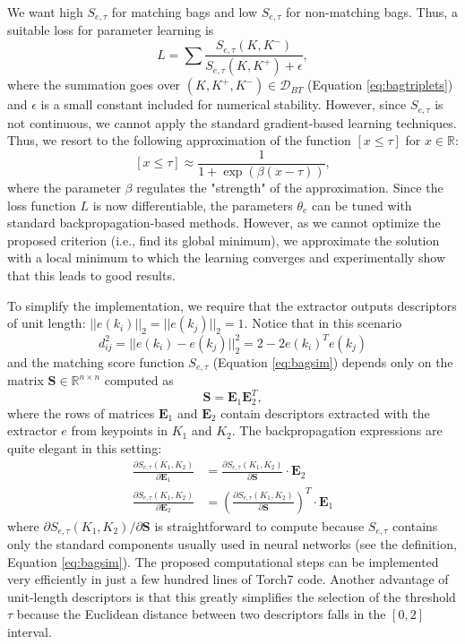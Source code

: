 \documentclass[10pt,conference,a4paper]{IEEEtran}
\begin{document}
		We want high $S_{e, \tau}$ for matching bags and low $S_{e, \tau}$ for non-matching bags.
		Thus, a suitable loss for parameter learning is
		\begin{equation}\label{eq:loss}
			L=
			\sum\frac{S_{e, \tau}(K, K^-)}{S_{e, \tau}(K, K^+) + \epsilon}
			,
		\end{equation}
		where the summation goes over $(K, K^+, K^-)\in\mathcal{D}_{BT}$ (Equation \eqref{eq:bagtriplets}) and $\epsilon$ is a small constant included for numerical stability.
		However, since $S_{e, \tau}$ is not continuous, we cannot apply the standard gradient-based learning techniques.
		Thus, we resort to the following approximation of the function $[x\leq\tau]$ for $x\in\mathbb{R}$:
		$$
			[x\leq\tau]\approx
			\frac{1}{1 + \exp(\beta(x-\tau))}
			,
		$$
		where the parameter $\beta$ regulates the "strength" of the approximation.
		Since the loss function $L$ is now differentiable, the parameters $\theta_e$ can be tuned with standard backpropagation-based methods.
		However, as we cannot optimize the proposed criterion (i.e., find its global minimum), we approximate the solution with a local minimum to which the learning converges and experimentally show that this leads to good results.

		To simplify the implementation, we require that the extractor outputs descriptors of unit length: $||e(k_i)||_2=||e(k_j)||_2=1$.
		Notice that in this scenario
		$$
			d_{ij}^2=
			|| e(k_i) - e(k_j) ||_2^2 =
			2 - 2e(k_i)^Te(k_j)
		$$
		and the matching score function $S_{e, \tau}$ (Equation \eqref{eq:bagsim}) depends only on the matrix $\mathbf{S}\in\mathbb{R}^{n\times n}$ computed as
		$$
			\mathbf{S}=
			\mathbf{E}_1\mathbf{E}_2^T
			,
		$$
		where the rows of matrices $\mathbf{E}_1$ and $\mathbf{E}_2$ contain descriptors extracted with the extractor $e$ from keypoints in $K_1$ and $K_2$.
		The backpropagation expressions are quite elegant in this setting:
		\begin{align*}
			\frac{\partial S_{e, \tau}(K_1, K_2)}{\partial \mathbf{E}_1}&=\frac{\partial S_{e, \tau}(K_1, K_2)}{\partial \mathbf{S}}\cdot\mathbf{E}_2	\\
			\frac{\partial S_{e, \tau}(K_1, K_2)}{\partial \mathbf{E}_2}&=\left(\frac{\partial S_{e, \tau}(K_1, K_2)}{\partial \mathbf{S}}\right)^T\cdot\mathbf{E}_1
		\end{align*}
		where $\partial S_{e, \tau}(K_1, K_2)/\partial \mathbf{S}$ is straightforward to compute because $S_{e, \tau}$ contains only the standard components usually used in neural networks (see the definition, Equation \eqref{eq:bagsim}).
		The proposed computational steps can be implemented very efficiently in just a few hundred lines of Torch7 code.
		Another advantage of unit-length descriptors is that this greatly simplifies the selection of the threshold $\tau$ because the Euclidean distance between two descriptors falls in the $[0, 2]$ interval.
\end{document}

